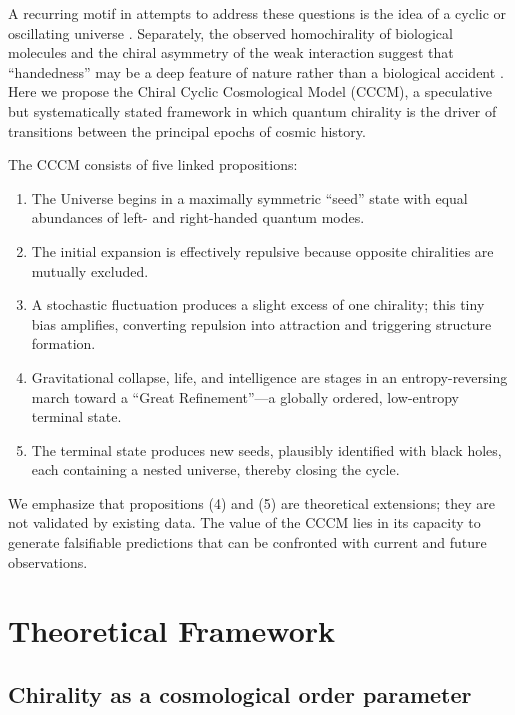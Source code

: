 \documentclass[a4paper,11pt]{article}
\newcommand{\CCCM}{CCCM}
\begin{document}
A recurring motif in attempts to address these questions is the idea of a cyclic or oscillating universe \citep{Steinhardt2002,Penrose2010}. Separately, the observed homochirality of biological molecules and the chiral asymmetry of the weak interaction suggest that ``handedness'' may be a deep feature of nature rather than a biological accident \citep{Glashow1961,Hazen2007}. Here we propose the Chiral Cyclic Cosmological Model (\CCCM), a speculative but systematically stated framework in which quantum chirality is the driver of transitions between the principal epochs of cosmic history.

The \CCCM{} consists of five linked propositions:
\begin{enumerate}[label=(\arabic*)]
    \item The Universe begins in a maximally symmetric ``seed'' state with equal abundances of left- and right-handed quantum modes.
    \item The initial expansion is effectively repulsive because opposite chiralities are mutually excluded.
    \item A stochastic fluctuation produces a slight excess of one chirality; this tiny bias amplifies, converting repulsion into attraction and triggering structure formation.
    \item Gravitational collapse, life, and intelligence are stages in an entropy-reversing march toward a ``Great Refinement''---a globally ordered, low-entropy terminal state.
    \item The terminal state produces new seeds, plausibly identified with black holes, each containing a nested universe, thereby closing the cycle.
\end{enumerate}

We emphasize that propositions (4) and (5) are theoretical extensions; they are not validated by existing data. The value of the \CCCM{} lies in its capacity to generate falsifiable predictions that can be confronted with current and future observations.

\section{Theoretical Framework}
\label{sec:theory}

\subsection{Chirality as a cosmological order parameter}
\end{document}
